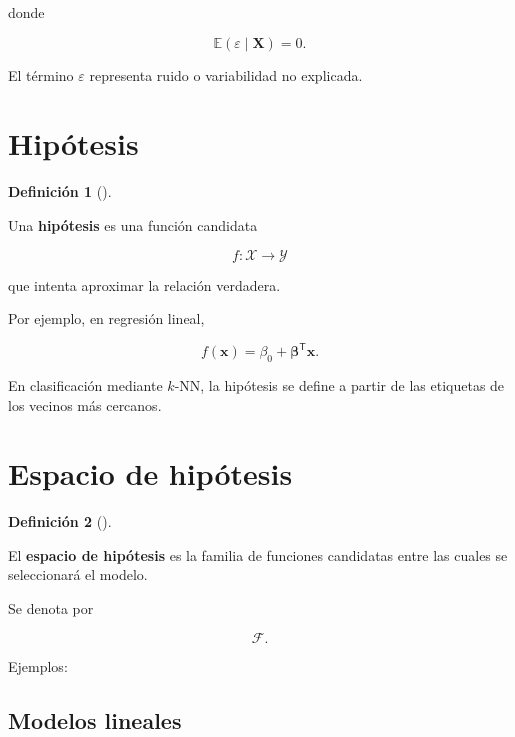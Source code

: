 \documentclass[
  spanish,
  10.5pt,
  letterpaper,
  DIV=11,
  numbers=noendperiod,
  oneside,
  open=any]{scrreprt}
\theoremstyle{definition}
\newtheorem{definition}{Definición}[chapter]
\theoremstyle{definition}
\theoremstyle{plain}
\theoremstyle{remark}
\begin{document}
donde

\[
\mathbb{E}(\varepsilon\mid\mathbf{X})=0.
\]

El término \(\varepsilon\) representa ruido o variabilidad no explicada.

\section*{Hipótesis}\label{hipuxf3tesis}


\begin{definition}[]\protect\hypertarget{def-hipotesis}{}\label{def-hipotesis}

Una \textbf{hipótesis} es una función candidata

\[
f:\mathcal{X}\to\mathcal{Y}
\]

que intenta aproximar la relación verdadera.

\end{definition}

Por ejemplo, en regresión lineal,

\[
f(\mathbf{x})
=
\beta_0
+
\boldsymbol{\beta}^{\mathsf T}\mathbf{x}.
\]

En clasificación mediante \(k\)-NN, la hipótesis se define a partir de
las etiquetas de los vecinos más cercanos.

\section*{Espacio de hipótesis}\label{espacio-de-hipuxf3tesis}


\begin{definition}[]\protect\hypertarget{def-espacio-hipotesis}{}\label{def-espacio-hipotesis}

El \textbf{espacio de hipótesis} es la familia de funciones candidatas
entre las cuales se seleccionará el modelo.

\end{definition}

Se denota por

\[
\mathcal{F}.
\]

Ejemplos:

\subsection*{Modelos lineales}\label{modelos-lineales}
\end{document}

